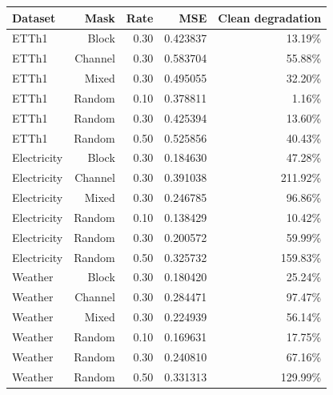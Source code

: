 \begin{tabular}{@{}lrrrr@{}}
\toprule
Dataset & Mask & Rate & MSE & Clean degradation \\
\midrule
ETTh1 & Block & 0.30 & 0.423837 & 13.19\% \\
ETTh1 & Channel & 0.30 & 0.583704 & 55.88\% \\
ETTh1 & Mixed & 0.30 & 0.495055 & 32.20\% \\
ETTh1 & Random & 0.10 & 0.378811 & 1.16\% \\
ETTh1 & Random & 0.30 & 0.425394 & 13.60\% \\
ETTh1 & Random & 0.50 & 0.525856 & 40.43\% \\
Electricity & Block & 0.30 & 0.184630 & 47.28\% \\
Electricity & Channel & 0.30 & 0.391038 & 211.92\% \\
Electricity & Mixed & 0.30 & 0.246785 & 96.86\% \\
Electricity & Random & 0.10 & 0.138429 & 10.42\% \\
Electricity & Random & 0.30 & 0.200572 & 59.99\% \\
Electricity & Random & 0.50 & 0.325732 & 159.83\% \\
Weather & Block & 0.30 & 0.180420 & 25.24\% \\
Weather & Channel & 0.30 & 0.284471 & 97.47\% \\
Weather & Mixed & 0.30 & 0.224939 & 56.14\% \\
Weather & Random & 0.10 & 0.169631 & 17.75\% \\
Weather & Random & 0.30 & 0.240810 & 67.16\% \\
Weather & Random & 0.50 & 0.331313 & 129.99\% \\
\bottomrule
\end{tabular}
